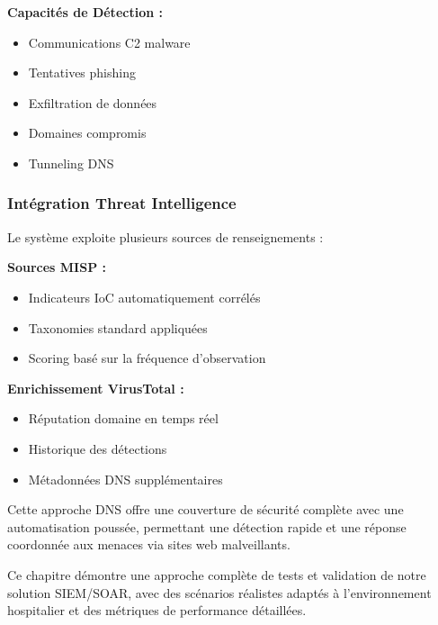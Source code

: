\textbf{Capacités de Détection :}
\begin{itemize}
    \item Communications C2 malware
    \item Tentatives phishing
    \item Exfiltration de données
    \item Domaines compromis
    \item Tunneling DNS
\end{itemize}

\subsubsection{Intégration Threat Intelligence}

Le système exploite plusieurs sources de renseignements :

\textbf{Sources MISP :}
\begin{itemize}
    \item Indicateurs IoC automatiquement corrélés
    \item Taxonomies standard appliquées
    \item Scoring basé sur la fréquence d'observation
\end{itemize}

\textbf{Enrichissement VirusTotal :}
\begin{itemize}
    \item Réputation domaine en temps réel
    \item Historique des détections
    \item Métadonnées DNS supplémentaires
\end{itemize}

Cette approche DNS offre une couverture de sécurité complète avec une automatisation poussée, permettant une détection rapide et une réponse coordonnée aux menaces via sites web malveillants.

Ce chapitre démontre une approche complète de tests et validation de notre solution SIEM/SOAR, avec des scénarios réalistes adaptés à l'environnement hospitalier et des métriques de performance détaillées.
